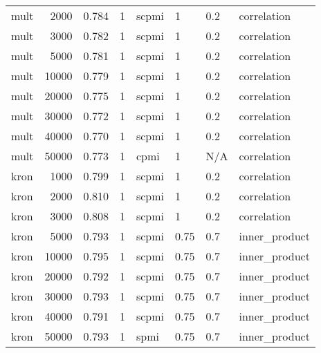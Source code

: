 \begin{tabular}{lrrlllll}
    mult &            2000 &  0.784 &     1 &  scpmi &       1 &  0.2 &    correlation \\
    mult &            3000 &  0.782 &     1 &  scpmi &       1 &  0.2 &    correlation \\
    mult &            5000 &  0.781 &     1 &  scpmi &       1 &  0.2 &    correlation \\
    mult &           10000 &  0.779 &     1 &  scpmi &       1 &  0.2 &    correlation \\
    mult &           20000 &  0.775 &     1 &  scpmi &       1 &  0.2 &    correlation \\
    mult &           30000 &  0.772 &     1 &  scpmi &       1 &  0.2 &    correlation \\
    mult &           40000 &  0.770 &     1 &  scpmi &       1 &  0.2 &    correlation \\
    mult &           50000 &  0.773 &     1 &   cpmi &       1 &  N/A &    correlation \\
    kron &            1000 &  0.799 &     1 &  scpmi &       1 &  0.2 &    correlation \\
    kron &            2000 &  0.810 &     1 &  scpmi &       1 &  0.2 &    correlation \\
    kron &            3000 &  0.808 &     1 &  scpmi &       1 &  0.2 &    correlation \\
    kron &            5000 &  0.793 &     1 &  scpmi &    0.75 &  0.7 &  inner\_product \\
    kron &           10000 &  0.795 &     1 &  scpmi &    0.75 &  0.7 &  inner\_product \\
    kron &           20000 &  0.792 &     1 &  scpmi &    0.75 &  0.7 &  inner\_product \\
    kron &           30000 &  0.793 &     1 &  scpmi &    0.75 &  0.7 &  inner\_product \\
    kron &           40000 &  0.791 &     1 &  scpmi &    0.75 &  0.7 &  inner\_product \\
    kron &           50000 &  0.793 &     1 &   spmi &    0.75 &  0.7 &  inner\_product \\
\bottomrule
\end{tabular}
